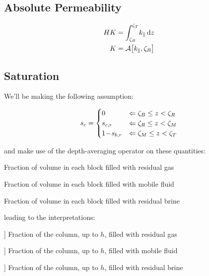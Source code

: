 \documentclass[12pt]{scrartcl}
\newcommand{\wid}[1]{\widthof{\bfseries {#1} \hspace{\labelsep}}}
\newcommand{\aleft}{\mathopen{}\mathclose\bgroup\left}  %
\newcommand{\aright}{\aftergroup\egroup\right}          %
\newcommand{\binop}[3]{#1\mkern1mu{#2}\mkern1mu #3}     %
\newcommand{\dual}[1]{\binop{1}{-}{#1}}                 %
\newcommand{\ddual}[2]{\binop{\binop{1}{-}{#1}}{-}{#2}} %
\newcommand{\intg}[4]{\int_{#1}^{#2}\!{#3}\,\mathrm{d}{#4}}   %
\newcommand{\latr}[1]{{#1}_{\|}}                              %
\newcommand{\Hei}{H}        %
\newcommand{\por}{\phi}     %
\newcommand{\sat}{s}        %
\newcommand{\sr}[1]{\sat_{#1,r}}    %
\newcommand{\Prm}{K}        %
\newcommand{\prm}{k}        %
\newcommand{\Lev}{\zeta}    %
\newcommand{\Top}{T}        %
\newcommand{\Bot}{B}        %
\newcommand{\Res}{R}        %
\newcommand{\Mob}{M}        %
\newcommand{\dph}{z}        %
\newcommand{\nap}{c}        %
\newcommand{\wet}{b}        %
\newcommand{\avg}[2]{\mathcal{A}\aleft[#1, #2\aright]}  %
\newcommand{\h}{h}          %
\newcommand{\satn}{\sat_\nap}
\newcommand{\snr}{\sr{\nap}}    %
\newcommand{\swr}{\sr{\wet}}    %
\newcommand{\LevT}{\Lev_\Top}
\newcommand{\LevB}{\Lev_\Bot}
\newcommand{\LevM}{\Lev_\Mob}
\newcommand{\LevR}{\Lev_\Res}
\begin{document}
\subsection{Absolute Permeability}
\begin{align}
\Hei \Prm &= \intg{ \LevB }{ \LevT }{ \latr{ \prm } }{ \dph } \\
\Prm &= \avg{ \latr{ \prm } }{ \LevB }
\end{align}

\subsection{Saturation}
We'll be making the following assumption:

\begin{equation}
\satn =
\begin{cases}
0        & \Leftarrow \LevB \leq \dph < \LevR \\
\snr     & \Leftarrow \LevR \leq \dph < \LevM \\
\dual{ \swr } & \Leftarrow \LevM \leq \dph < \LevT
\end{cases}
\end{equation}

and make use of the depth-averaging operator on these quantities:

\begin{description}[labelwidth=\wid{\( \por \left( \ddual{ \swr }{ \snr } \right) \)}]
\item[ \( \por \left( \snr \right) \) ] Fraction of volume in each block filled with residual gas
\item[ \( \por \left( \ddual{ \swr }{ \snr } \right) \) ] Fraction of volume in each block filled with mobile fluid
\item[ \( \por \left( \dual{ \swr } \right) \) ] Fraction of volume in each block filled with residual brine
\end{description}

leading to the interpretations:

\begin{description}[labelwidth=\wid{\( \avg{ \por \left( \ddual{ \swr }{ \snr } \right) }{ \h } \)}]
\item[ \( \avg{ \por \left( \snr \right) }{ \h } \) ] Fraction of the column, up to \( \h \), filled with residual gas
\item[ \( \avg{ \por \left( \ddual{ \swr }{ \snr } \right) }{ \h } \) ] Fraction of the column, up to \( \h \), filled with mobile fluid
\item[ \( \avg{ \por \left( \dual{ \swr } \right) }{ \h } \) ] Fraction of the column, up to \( \h \), filled with residual brine
\end{description}
\end{document}
